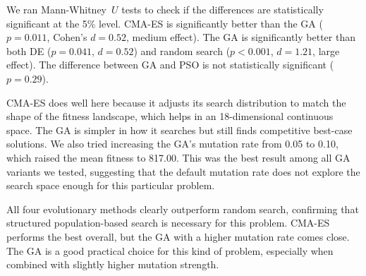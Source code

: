 \documentclass[11pt,a4paper]{article}
\begin{document}
We ran Mann-Whitney~$U$ tests to check if the differences are statistically significant at the 5\% level. CMA-ES is significantly better than the GA ($p = 0.011$, Cohen's $d = 0.52$, medium effect). The GA is significantly better than both DE ($p = 0.041$, $d = 0.52$) and random search ($p < 0.001$, $d = 1.21$, large effect). The difference between GA and PSO is not statistically significant ($p = 0.29$).

CMA-ES does well here because it adjusts its search distribution to match the shape of the fitness landscape, which helps in an 18-dimensional continuous space. The GA is simpler in how it searches but still finds competitive best-case solutions. We also tried increasing the GA's mutation rate from 0.05 to 0.10, which raised the mean fitness to 817.00. This was the best result among all GA variants we tested, suggesting that the default mutation rate does not explore the search space enough for this particular problem.

All four evolutionary methods clearly outperform random search, confirming that structured population-based search is necessary for this problem. CMA-ES performs the best overall, but the GA with a higher mutation rate comes close. The GA is a good practical choice for this kind of problem, especially when combined with slightly higher mutation strength.
\end{document}
